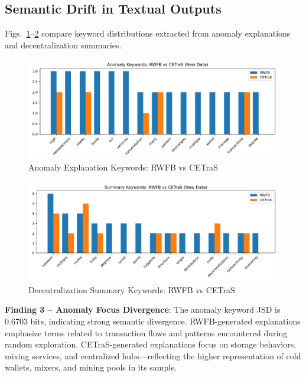 \subsection{Semantic Drift in Textual Outputs}

Figs.~\ref{fig:anom-keywords}--\ref{fig:sum-keywords} compare keyword distributions extracted from anomaly explanations and decentralization summaries.

\begin{figure}[!t]
  \centering
  \includegraphics[width=\linewidth]{new_analysis/outputs/compare/compare_anomaly_keywords.png}
  \caption{Anomaly Explanation Keywords: RWFB vs CETraS}
  \label{fig:anom-keywords}
\end{figure}

\begin{figure}[!t]
  \centering
  \includegraphics[width=\linewidth]{new_analysis/outputs/compare/compare_summary_keywords.png}
  \caption{Decentralization Summary Keywords: RWFB vs CETraS}
  \label{fig:sum-keywords}
\end{figure}

\textbf{Finding 3 -- Anomaly Focus Divergence}: The anomaly keyword JSD is 0.6703 bits, indicating strong semantic divergence. RWFB-generated explanations emphasize terms related to transaction flows and patterns encountered during random exploration. CETraS-generated explanations focus on storage behaviors, mixing services, and centralized hubs---reflecting the higher representation of cold wallets, mixers, and mining pools in its sample.

